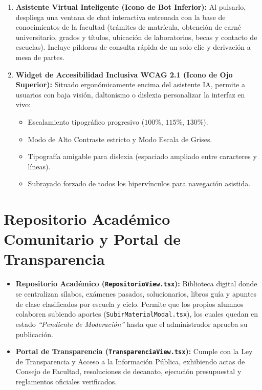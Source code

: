 \documentclass[12pt,a4paper,oneside]{report}
\begin{document}
\begin{enumerate}[label=\textbf{\arabic*.}, leftmargin=1.1cm]
  \item \textbf{Asistente Virtual Inteligente (Icono de Bot Inferior):} Al pulsarlo, despliega una ventana de chat interactiva entrenada con la base de conocimientos de la facultad (trámites de matrícula, obtención de carné universitario, grados y títulos, ubicación de laboratorios, becas y contacto de escuelas). Incluye píldoras de consulta rápida de un solo clic y derivación a mesa de partes.
  \item \textbf{Widget de Accesibilidad Inclusiva WCAG 2.1 (Icono de Ojo Superior):} Situado ergonómicamente encima del asistente IA, permite a usuarios con baja visión, daltonismo o dislexia personalizar la interfaz en vivo:
    \begin{itemize}[leftmargin=0.6cm]
      \item Escalamiento tipográfico progresivo ($100\%$, $115\%$, $130\%$).
      \item Modo de Alto Contraste estricto y Modo Escala de Grises.
      \item Tipografía amigable para dislexia (espaciado ampliado entre caracteres y líneas).
      \item Subrayado forzado de todos los hipervínculos para navegación asistida.
    \end{itemize}
\end{enumerate}

\section{Repositorio Académico Comunitario y Portal de Transparencia}
\begin{itemize}[leftmargin=1.0cm]
  \item \textbf{Repositorio Académico (\texttt{RepositorioView.tsx}):} Biblioteca digital donde se centralizan sílabos, exámenes pasados, solucionarios, libros guía y apuntes de clase clasificados por escuela y ciclo. Permite que los propios alumnos colaboren subiendo aportes (\texttt{SubirMaterialModal.tsx}), los cuales quedan en estado \textit{``Pendiente de Moderación''} hasta que el administrador aprueba su publicación.
  \item \textbf{Portal de Transparencia (\texttt{TransparenciaView.tsx}):} Cumple con la Ley de Transparencia y Acceso a la Información Pública, exhibiendo actas de Consejo de Facultad, resoluciones de decanato, ejecución presupuestal y reglamentos oficiales verificados.
\end{itemize}
\end{document}

